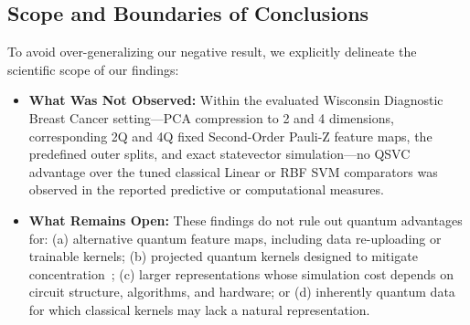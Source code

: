 \documentclass[12pt,a4paper]{article}
\begin{document}
\subsection{Scope and Boundaries of Conclusions}
To avoid over-generalizing our negative result, we explicitly delineate the scientific scope of our findings:
\begin{itemize}
    \item \textbf{What Was Not Observed:} Within the evaluated Wisconsin Diagnostic Breast Cancer setting---PCA compression to 2 and 4 dimensions, corresponding 2Q and 4Q fixed Second-Order Pauli-Z feature maps, the predefined outer splits, and exact statevector simulation---no QSVC advantage over the tuned classical Linear or RBF SVM comparators was observed in the reported predictive or computational measures.
    \item \textbf{What Remains Open:} These findings do not rule out quantum advantages for: (a) alternative quantum feature maps, including data re-uploading or trainable kernels; (b) projected quantum kernels designed to mitigate concentration~\cite{huang2021power}; (c) larger representations whose simulation cost depends on circuit structure, algorithms, and hardware; or (d) inherently quantum data for which classical kernels may lack a natural representation.
\end{itemize}
\end{document}

